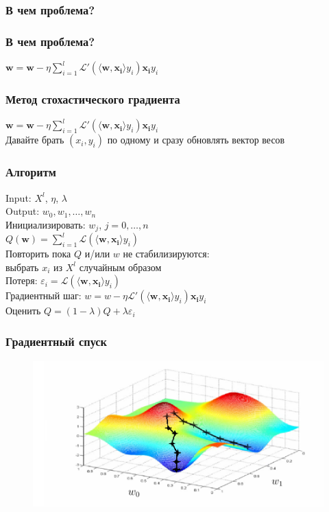 \documentclass[12pt]{beamer}
\begin{document}
\begin{frame}\frametitle{В чем проблема?}

\end{frame}

\begin{frame}\frametitle{В чем проблема?}
$\mathbf{w} =  \mathbf{w} - \eta \sum\limits_{i=1}^l \mathcal{L}'(\langle \mathbf{w}, \mathbf{x_i} \rangle y_i)\mathbf{x_i}y_i$\\
\vspace{5mm}
\end{frame}

\begin{frame}\frametitle{Метод стохастического градиента}
$\mathbf{w} =  \mathbf{w} - \eta \sum\limits_{i=1}^l \mathcal{L}'(\langle \mathbf{w}, \mathbf{x_i}\rangle y_i)\mathbf{x_i}y_i$\\
\vspace{5mm}
Давайте брать $(x_i, y_i)$ по одному и сразу обновлять вектор весов
\end{frame}


\begin{frame}\frametitle{Алгоритм}
Input: $X^l$, $\eta$, $\lambda$\\
Output: $w_0, w_1, \dots, w_n$\\
\vspace{3mm}
Инициализировать: $w_j$, $j=0,\dots, n$\\
\hspace{35mm} ${Q}(\mathbf{w}) = \sum\limits_{i=1}^l \mathcal{L}(\langle \mathbf{w}, \mathbf{x_i} \rangle y_i)$\\
Повторить пока $Q$ и/или $w$ не стабилизируются:\\
\hspace{5mm} выбрать $x_i$ из $X^l$ случайным образом\\
\hspace{5mm} Потеря: $\varepsilon_i = \mathcal{L}(\langle \mathbf{w}, \mathbf{x_i} \rangle y_i)$\\
\hspace{5mm} Градиентный шаг: $w =  w - \eta \mathcal{L}'(\langle \mathbf{w}, \mathbf{x_i}\rangle y_i)\mathbf{x_i}y_i$\\
\hspace{5mm} Оценить $Q = (1-\lambda)Q + \lambda \varepsilon_i$
\end{frame}


\begin{frame}\frametitle{Градиентный спуск}
\begin{figure}[htbp]
  \includegraphics[height=160pt, keepaspectratio = true]{images/gradient_descent2}   
\end{figure}
\end{frame}
\end{document}
